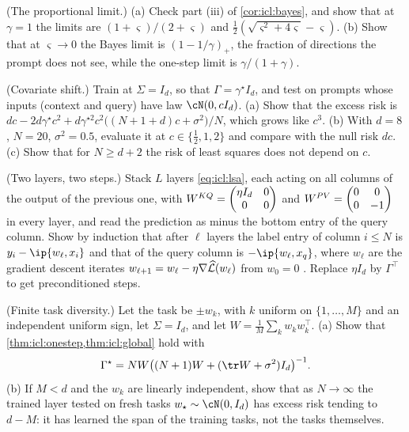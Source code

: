 \begin{refsection}
\begin{exercises}
\item \consolidation (The proportional limit.) (a) Check part (iii) of \cref{cor:icl:bayes}, and show that at $\gamma=1$ the limits are $(1+\varsigma)/(2+\varsigma)$ and $\frac12(\sqrt{\varsigma^2+4\varsigma}-\varsigma)$. (b) Show that at $\varsigma\to0$ the Bayes limit is $(1-1/\gamma)_+$, the fraction of directions the prompt does not see, while the one-step limit is $\gamma/(1+\gamma)$.\label{ex:icl:proportional}

\item \variation (Covariate shift.) Train at $\Sigma=I_d$, so that $\Gamma=\gamma^\star I_d$, and test on prompts whose inputs (context and query) have law $\cN(0,cI_d)$. (a) Show that the excess risk is $dc-2d\gamma^\star c^2+d\gamma^{\star2}c^2\bigl((N+1+d)c+\sigma^2\bigr)/N$, which grows like $c^3$. (b) With $d=8$, $N=20$, $\sigma^2=0.5$, evaluate it at $c\in\{\frac12,1,2\}$ and compare with the null risk $dc$. (c) Show that for $N\ge d+2$ the risk of least squares does not depend on $c$.\label{ex:icl:covshift}

\item \variation (Two layers, two steps.) Stack $L$ layers \eqref{eq:icl:lsa}, each acting on all columns of the output of the previous one, with $W^{KQ}=\begin{pmatrix}\eta I_d&0\\0&0\end{pmatrix}$ and $W^{PV}=\begin{pmatrix}0&0\\0&-1\end{pmatrix}$ in every layer, and read the prediction as minus the bottom entry of the query column. Show by induction that after $\ell$ layers the label entry of column $i\le N$ is $y_i-\ip{w_\ell,x_i}$ and that of the query column is $-\ip{w_\ell,x_q}$, where $w_\ell$ are the gradient descent iterates $w_{\ell+1}=w_\ell-\eta\nabla\widehat{\mathcal{L}}(w_\ell)$ from $w_0=0$ \parencite{VonOswaldEtAl2023}. Replace $\eta I_d$ by $\Gamma^\top$ to get preconditioned steps.\label{ex:icl:twolayers}

\item \variation (Finite task diversity.) Let the task be $\pm w_k$, with $k$ uniform on $\{1,\dots,M\}$ and an independent uniform sign, let $\Sigma=I_d$, and let $W=\frac1M\sum_kw_kw_k^\top$. (a) Show that \cref{thm:icl:onestep,thm:icl:global} hold with
\[
  \Gamma^\star=NW\bigl((N+1)W+(\tr W+\sigma^2)I_d\bigr)^{-1}.
\] (b) If $M<d$ and the $w_k$ are linearly independent, show that as $N\to\infty$ the trained layer tested on fresh tasks $w_\star\sim\cN(0,I_d)$ has excess risk tending to $d-M$: it has learned the span of the training tasks, not the tasks themselves. \label{ex:icl:diversity}


\end{exercises}
\end{refsection}
